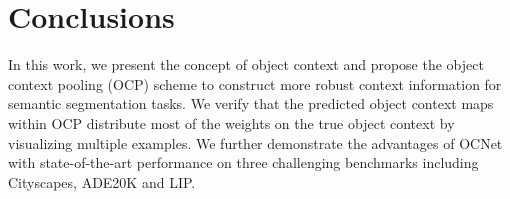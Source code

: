 \documentclass[10pt,twocolumn,letterpaper]{article}
\begin{document}

\section{Conclusions}

In this work,
we present the concept of object context 
and propose the object context pooling (OCP) scheme 
to construct more robust context information for semantic segmentation tasks.
We verify that the predicted object context maps
within OCP distribute most of the weights on the true object context
by visualizing multiple examples.
We further demonstrate the advantages of OCNet 
with state-of-the-art performance on three challenging benchmarks 
including Cityscapes, ADE20K and LIP.


{\small


}
\end{document}
